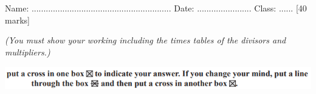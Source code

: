 \documentclass{article}
\date{}
\begin{document}
\fontsize{13}{15} \selectfont %

\begin{center}
  \qquad \\ 
\end{center} \\ 

Name: ...........................................................  \hspace{0.5cm}  Date: ....................... \hspace{0.5cm}  Class: ......\hspace{0.5cm} [40 marks]

\par
\vspace*{5pt} 
\textit{(You must show your working including the times tables of the divisors and multipliers.)  }

\begin{center}
    \includegraphics[width=15cm]{Year_6_Mixed_Tests/Xx.png}
\end{center}
 \\
\end{document}
